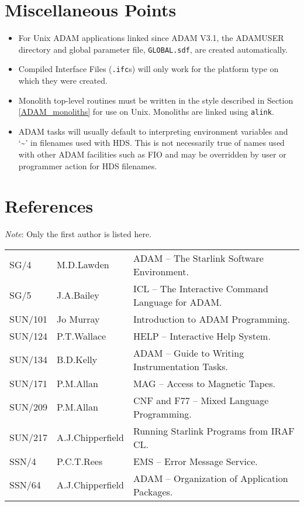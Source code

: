 \documentclass[twoside,11pt]{article}
\newenvironment{latexonly}{}{}
\newcommand{\xlabel}[1]{}
\renewcommand{\_}{\texttt{\symbol{95}}}
\begin{document}
\section{\xlabel{miscellaneous_points}Miscellaneous Points}
\begin{itemize}
\item For Unix ADAM applications linked since ADAM V3.1, the ADAM\_USER
directory and global parameter file, \texttt{GLOBAL.sdf}, are created 
automatically. 
\item Compiled Interface Files (\texttt{.ifc}s) will only work for the platform
type on which they were created.
\item Monolith top-level routines must be written in the style described
in Section \ref{ADAM_monoliths} for use on Unix. 
Monoliths are linked using \texttt{alink}.
\item ADAM tasks will usually default to interpreting environment variables
and `\~{}' in filenames used with HDS. This is not necessarily true of 
names used with other ADAM facilities such as FIO and may be overridden by 
user or programmer action for HDS filenames.
\end{itemize}

\section{\xlabel{references}References}
\emph{Note}: Only the first author is listed here.

\begin{latexonly}
\begin{tabular}{lll}
SG/4 & M.D.Lawden & ADAM -- The Starlink Software Environment.\\
SG/5 & J.A.Bailey & ICL -- The Interactive Command Language for ADAM.\\
SUN/101 & Jo Murray & Introduction to ADAM Programming.\\
SUN/124 & P.T.Wallace & HELP -- Interactive Help System.\\
SUN/134 & B.D.Kelly & ADAM -- Guide to Writing Instrumentation Tasks.\\
SUN/171 & P.M.Allan & MAG -- Access to Magnetic Tapes.\\
SUN/209 & P.M.Allan & CNF and F77 -- Mixed Language Programming.\\
SUN/217 & A.J.Chipperfield & Running Starlink Programs from IRAF CL.\\
SSN/4 & P.C.T.Rees  &EMS -- Error Message Service.\\
SSN/64 & A.J.Chipperfield & ADAM -- Organization of Application Packages.
\end{tabular}
\end{latexonly}
\end{document}
